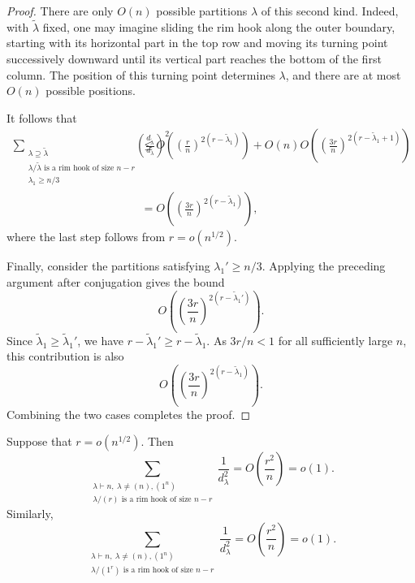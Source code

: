 \begin{proof}
There are only $O(n)$ possible partitions $\lambda$ of this second
kind. Indeed, with $\widetilde\lambda$ fixed, one may imagine sliding
the rim hook along the outer boundary, starting with its horizontal
part in the top row and moving its turning point successively
downward until its vertical part reaches the bottom of the first
column. The position of this turning point determines $\lambda$, and
there are at most $O(n)$ possible positions.

It follows that
\begin{align*}
\sum_{\substack{\lambda\supseteq\widetilde\lambda\\
\lambda/\widetilde\lambda\text{ is a rim hook of size }n-r\\
\lambda_1\ge n/3}}
\left(\frac{d_{\widetilde\lambda}}{d_\lambda}\right)^2 &\le O\left(\left(\frac{r}{n}\right)^{
2(r-\widetilde\lambda_1)}\right)+O(n)
O\left(\left(\frac{3r}{n}\right)^{
2(r-\widetilde\lambda_1+1)}\right) \\
&=O\left(\left(\frac{3r}{n}\right)^{
2(r-\widetilde\lambda_1)}\right),
\end{align*}
where the last step follows from $r=o(n^{1/2})$.

Finally, consider the partitions satisfying $\lambda_1'\ge n/3$.
Applying the preceding argument after conjugation gives the bound
$$
O\left(
\left(\frac{3r}{n}\right)^{
2(r-\widetilde\lambda_1')}
\right).
$$
Since $\widetilde\lambda_1\ge\widetilde\lambda_1'$, we have $r-\widetilde\lambda_1'\ge r-\widetilde\lambda_1$. As $3r/n<1$ for all sufficiently large $n$, this contribution is also
$$
O\left(
\left(\frac{3r}{n}\right)^{
2(r-\widetilde\lambda_1)}
\right).
$$
Combining the two cases completes the proof.
\end{proof}

\begin{prop}
\label{prop: one row and one column cores}
Suppose that $r=o(n^{1/2})$. Then
$$
\sum_{\substack{\lambda\vdash n,\ \lambda\neq(n),(1^n)\\
\lambda/(r)\text{ is a rim hook of size }n-r}}
\frac{1}{d_\lambda^2}=O\left(\frac{r^2}{n}\right)=o(1).
$$
Similarly,
$$
\sum_{\substack{\lambda\vdash n,\ \lambda\neq(n),(1^n)\\
\lambda/(1^r)\text{ is a rim hook of size }n-r}}\frac{1}{d_\lambda^2}=O\left(\frac{r^2}{n}\right)=o(1).
$$
\end{prop}

